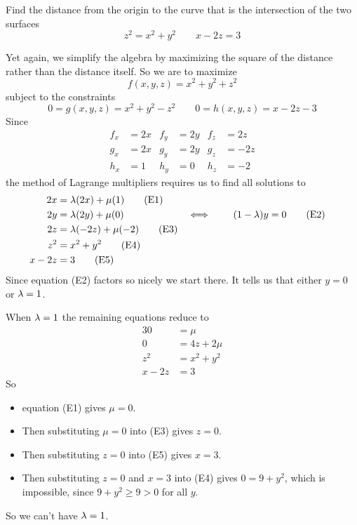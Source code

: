 \begin{eg}\label{eg double Lagrange}
Find the distance from the origin to the curve that is the intersection
of the two surfaces
\begin{equation*}
z^2=x^2+y^2\qquad x-2z=3
\end{equation*}

\soln 
Yet again, we simplify the algebra by maximizing the square 
of the distance rather than the distance itself. So we are to maximize 
\begin{equation*}
f(x,y,z)=x^2+y^2+z^2
\end{equation*}
subject to the constraints
\begin{equation*}
0=g(x,y,z)=x^2+y^2-z^2\qquad
0=h(x,y,z)=x-2z-3
\end{equation*}
Since
\begin{align*}
f_x&=2x &  f_y&=2y  & f_z&=2z \\
g_x&=2x &  g_y&=2y  & g_z&=-2z \\
h_x&=1  &  h_y&=0   & h_z&=-2 
\end{align*}
the method of Lagrange multipliers requires us to find all solutions to
\begin{alignat*}{3}
2x&=\lambda(2x) + \mu(1)  \tag{E1} \\
2y&=\lambda(2y) + \mu(0) \qquad&\iff\qquad(1-\lambda)y&=0 \tag{E2} \\
2z&=\lambda(-2z) + \mu(-2)  \tag{E3} \\
z^2&=x^2+y^2 \tag{E4} \\
x-2z&=3 \tag{E5}
\end{alignat*}
Since equation (E2) factors so nicely we start there.
It tells us that either $y=0$ or $\lambda=1$.

\medskip
{} 
When $\lambda=1$ the remaining equations reduce to
\begin{alignat*}{3}
0&=\mu  \tag{E1} \\
0&=4z + 2 \mu  \tag{E3} \\
z^2&=x^2+y^2 \tag{E4} \\
x-2z&=3 \tag{E5}
\end{alignat*}
So
\begin{itemize}\itemsep1pt \parskip0pt 
\item
equation (E1) gives $\mu=0$.
\item
Then substituting $\mu=0$ into (E3) gives $z=0$.
\item
Then substituting $z=0$ into (E5) gives $x=3$.
\item
Then substituting $z=0$ and $x=3$ into (E4) gives $0=9+y^2$,
which is impossible, since $9+y^2\ge 9>0$ for all $y$.
\end{itemize}
So we can't have $\lambda=1$.


\end{eg}
